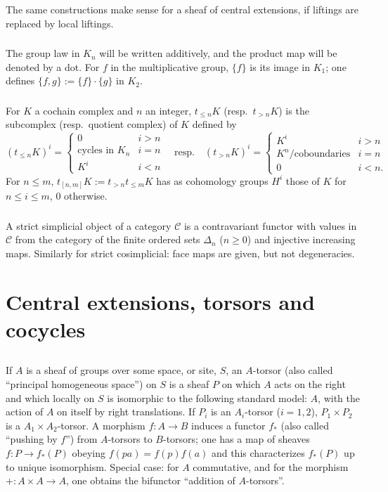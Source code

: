 \documentclass[11pt,a4paper]{article}
\theoremstyle{plain}
\theoremstyle{definition}
\newcommand{\cC}{\mathcal{C}}
\begin{document}
The same constructions make sense for a sheaf of central extensions, if liftings are replaced by local liftings.

\subsubsection{}
The group law in $K_n$ will be written additively, and the product map will be denoted by a dot. For $f$ in the multiplicative group, $\{f\}$ is its image in $K_1$; one defines $\{f,g\} := \{f\} \cdot \{g\}$ in $K_2$.

\subsubsection{}
For $K$ a cochain complex and $n$ an integer, $t_{\leq n}K$ (resp.~$t_{>n}K$) is the subcomplex (resp.~quotient complex) of $K$ defined by
\[(t_{\leq n}K)^i = \begin{cases} 0 & i > n \\ \text{cycles in } K_n & i = n \\ K^i & i < n \end{cases} \quad \text{resp.}\quad (t_{>n}K)^i = \begin{cases} K^i & i > n \\ K^n/\text{coboundaries} & i = n \\ 0 & i < n. \end{cases}\]
For $n \leq m$, $t_{[n,m]}K := t_{>n} t_{\leq m} K$ has as cohomology groups $H^i$ those of $K$ for $n \leq i \leq m$, $0$ otherwise.

\subsubsection{}
A strict simplicial object of a category $\cC$ is a contravariant functor with values in $\cC$ from the category of the finite ordered sets $\Delta_n$ ($n \geq 0$) and injective increasing maps. Similarly for strict cosimplicial: face maps are given, but not degeneracies.

\section{Central extensions, torsors and cocycles}

\subsection{}
If $A$ is a sheaf of groups over some space, or site, $S$, an $A$-torsor (also called ``principal homogeneous space'') on $S$ is a sheaf $P$ on which $A$ acts on the right and which locally on $S$ is isomorphic to the following standard model: $A$, with the action of $A$ on itself by right translations. If $P_i$ is an $A_i$-torsor ($i=1,2$), $P_1 \times P_2$ is a $A_1 \times A_2$-torsor. A morphism $f: A \to B$ induces a functor $f_*$ (also called ``pushing by $f$'') from $A$-torsors to $B$-torsors; one has a map of sheaves $f: P \to f_*(P)$ obeying $f(pa) = f(p)f(a)$ and this characterizes $f_*(P)$ up to unique isomorphism. Special case: for $A$ commutative, and for the morphism $+: A \times A \to A$, one obtains the bifunctor ``addition of $A$-torsors''.
\end{document}
